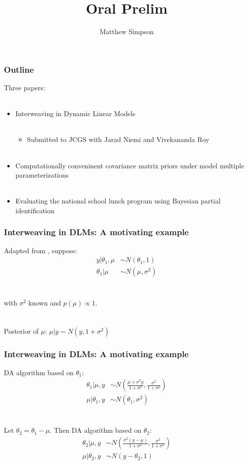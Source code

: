 \documentclass[xcolor=dvipsnames]{beamer}
\title[Oral Prelim]{Oral Prelim}
\author[Matt Simpson]{Matthew Simpson}
\date{}
\institute[]{Departments of Statistics and Economics, Iowa State University}
\begin{document}
\begin{frame}
\titlepage
\end{frame}

\begin{frame}
\frametitle{Outline}
Three papers:\\~\\
\begin{itemize}
\item Interweaving in Dynamic Linear Models \\~\\
\begin{itemize}
\item Submitted to JCGS with Jarad Niemi and Vivekananda Roy\\~\\
\end{itemize}
\item Computationally conveninent covariance matrix priors under model multiple parameterizations\\~\\
\item Evaluating the national school lunch program using Bayesian partial identification
\end{itemize}
\end{frame}

\begin{frame}
\frametitle{Interweaving in DLMs: A motivating example}
Adapted from \citet{yu2011center}, suppose:\\
\begin{align*}
y|\theta_1, \mu & \sim N(\theta_1, 1) \\
\theta_1|\mu & \sim N(\mu, \sigma^2) 
\end{align*}\\~\\
with $\sigma^2$ known and $p(\mu)\propto 1$.\\~\\~\\

\pause Posterior of $\mu$: $\mu|y \sim N(y,1+\sigma^2)$

\end{frame}

\begin{frame}
\frametitle{Interweaving in DLMs: A motivating example}

DA algorithm based on $\theta_1$:
\begin{align*}
\theta_1|\mu,y &\sim N\left(\frac{\mu + \sigma^2y}{1+\sigma^2}, \frac{\sigma^2}{1+\sigma^2}\right)\\
\mu |\theta_1, y &\sim N(\theta_1, \sigma^2)
\end{align*}\\~\\

\pause Let $\theta_2 = \theta_1 - \mu$. Then DA algorithm based on $\theta_2$:
\begin{align*}
\theta_2|\mu,y &\sim N\left(\frac{\sigma^2(y - \mu)}{1+\sigma^2}, \frac{\sigma^2}{1+\sigma^2}\right)\\
\mu |\theta_2, y &\sim N(y-\theta_2, 1)
\end{align*}
\end{frame}
\end{document}
